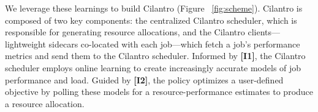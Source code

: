 

We leverage these learnings to build Cilantro (Figure ~\ref{fig:scheme}). Cilantro is composed of two key components: the centralized Cilantro scheduler, which is responsible for generating resource allocations, and the Cilantro clients---lightweight sidecars co-located with each job---which fetch a job's performance metrics and send them to the Cilantro scheduler. Informed by \textbf{[I1]}, the Cilantro scheduler employs online learning to create increasingly accurate models of job performance and load. Guided by \textbf{[I2]}, the policy optimizes a user-defined objective by polling these models for a resource-performance estimates to produce a resource allocation.




